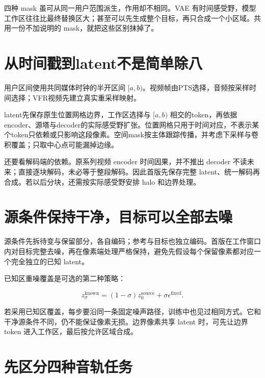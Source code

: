 四种 mask 虽可从同一用户范围派生，作用却不相同。VAE 有时间感受野，模型工作区往往比最终替换区大；甚至可以先生成整个目标，再只合成一个小区域。共用一份不加说明的 mask，就把这些区别抹掉了。

\section{从时间戳到latent不是简单除八}\label{seedance-m23-ux4eceux65f6ux95f4ux6233ux5230latentux4e0dux662fux7b80ux5355ux9664ux516b}

用户区间使用共同媒体时钟的半开区间 \([a,b)\)。视频帧由PTS选择，音频按采样时间选择；VFR视频先建立真实重采样映射。

latent先保存原生位置网格边界，工作区选择与 \([a,b)\) 相交的token，再依据encoder、源塔与decoder的实际感受野扩张。位置网格只用于时间对应，不表示某个token只依赖或只影响这段像素。空间mask按主体跟踪传播，并考虑下采样与卷积覆盖；只取中心点可能漏掉边缘。

还要看解码端的依赖。原系列视频 encoder 时间因果，并不推出 decoder 不读未来；直接逐块解码，未必等于整段解码。因此首版先保存完整 latent、统一解码再合成。若以后分块，还需按实际感受野安排 halo 和边界处理。

\section{源条件保持干净，目标可以全部去噪}\label{seedance-m23-ux6e90ux6761ux4ef6ux4fddux6301ux5e72ux51c0ux76eeux6807ux53efux4ee5ux5168ux90e8ux53bbux566a}

源条件先拆待变与保留部分，各自编码；参考与目标也独立编码。首版在工作窗口内对目标完整去噪，再在像素端处理严格保持，避免先假设每个保留像素都对应一个完全独立的已知 latent。

已知区重噪覆盖是可选的第二种策略：

\[
z_{\sigma}^{\mathrm{known}}=(1-\sigma)z_0^{\mathrm{source}}+
\sigma\epsilon^{\mathrm{fixed}}.
\]

若采用已知区覆盖，每步要沿同一条固定噪声路径，训练中也见过相同方式。它和干净源条件不同，仍不能保证像素无损。边界像素共享 latent 时，可先让边界 token 进入工作区，最后按允许区域合成。

\section{先区分四种音轨任务}\label{seedance-m23-ux5148ux533aux5206ux56dbux79cdux97f3ux8f68ux4efbux52a1}

